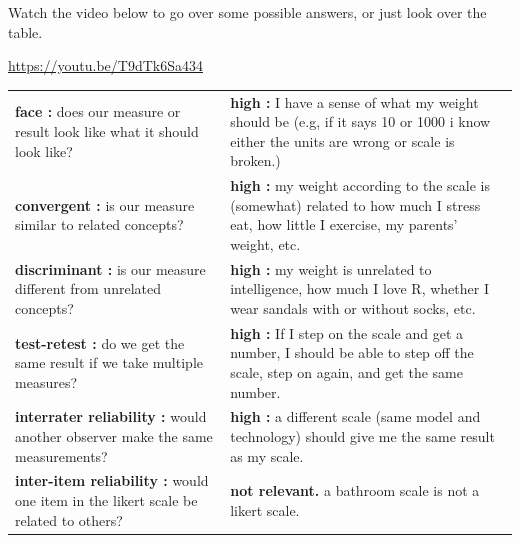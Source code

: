 \documentclass[
  letterpaper,
  DIV=11,
  numbers=noendperiod,
  oneside]{scrreprt}
\begin{document}
\begin{tcolorbox}[enhanced jigsaw, toptitle=1mm, toprule=.15mm, rightrule=.15mm, breakable, left=2mm, colbacktitle=quarto-callout-tip-color!10!white, colback=white, opacityback=0, coltitle=black, bottomtitle=1mm, opacitybacktitle=0.6, titlerule=0mm, leftrule=.75mm, arc=.35mm, bottomrule=.15mm, title=\textcolor{quarto-callout-tip-color}{\faLightbulb}\hspace{0.5em}{Expand To See Answers}, colframe=quarto-callout-tip-color-frame]

Watch the video below to go over some possible answers, or just look
over the table.

\url{https://youtu.be/T9dTk6Sa434}

\begin{longtable}[]{@{}
  >{\raggedright\arraybackslash}p{}
  >{\raggedright\arraybackslash}p{}@{}}
\toprule\noalign{}
\endhead
\bottomrule\noalign{}
\endlastfoot
\textbf{face :} does our measure or result look like what it should look
like? & \textbf{high :} I have a sense of what my weight should be (e.g,
if it says 10 or 1000 i know either the units are wrong or scale is
broken.) \\
\textbf{convergent :} is our measure similar to related concepts? &
\textbf{high :} my weight according to the scale is (somewhat) related
to how much I stress eat, how little I exercise, my parents' weight,
etc. \\
\textbf{discriminant :} is our measure different from unrelated
concepts? & \textbf{high :} my weight is unrelated to intelligence, how
much I love R, whether I wear sandals with or without socks, etc. \\
\textbf{test-retest :} do we get the same result if we take multiple
measures? & \textbf{high :} If I step on the scale and get a number, I
should be able to step off the scale, step on again, and get the same
number. \\
\textbf{interrater reliability :} would another observer make the same
measurements? & \textbf{high :} a different scale (same model and
technology) should give me the same result as my scale. \\
\textbf{inter-item reliability :} would one item in the likert scale be
related to others? & \textbf{not relevant.} a bathroom scale is not a
likert scale. \\
\end{longtable}

\end{tcolorbox}
\end{document}

